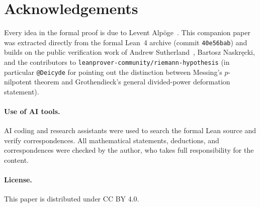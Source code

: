 \documentclass[11pt]{amsart}
\theoremstyle{plain}
\theoremstyle{definition}
\numberwithin{equation}{section}
\begin{document}
\section*{Acknowledgements}

Every idea in the formal proof is due to Levent Alp\"oge~\cite{alpoge-remark}. This companion paper
was extracted directly from the formal Lean~4 archive (commit \texttt{40e56bab}) and builds on the
public verification work of Andrew Sutherland~\cite{sutherland}, Bartosz Naskr\k{e}cki, and the
contributors to \texttt{leanprover-community/riemann-hypothesis} (in particular \texttt{@Deicyde}
for pointing out the distinction between Messing's $p$-nilpotent theorem and Grothendieck's general
divided-power deformation statement).

\paragraph{Use of AI tools.} AI coding and research assistants were used to search the formal Lean
source and verify correspondences. All mathematical statements, deductions, and correspondences
were checked by the author, who takes full responsibility for the content.

\paragraph{License.} This paper is distributed under CC BY 4.0.
\end{document}
